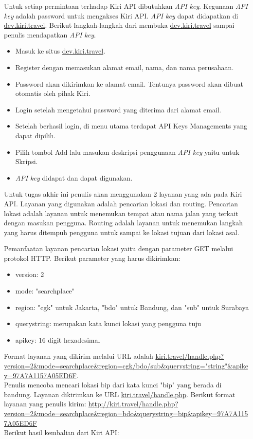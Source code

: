 \hspace{0.5cm} Untuk setiap permintaan terhadap Kiri API dibutuhkan \textit{API key}. Kegunaan \textit{API key} adalah password untuk mengakses Kiri API. \textit{API key} dapat didapatkan di \url{dev.kiri.travel}. Berikut langkah-langkah dari membuka \url{dev.kiri.travel} sampai penulis mendapatkan \textit{API key}.
\begin{itemize}
	\item Masuk ke situs \url{dev.kiri.travel}.
	\item Register dengan memasukan alamat email, nama, dan nama perusahaan.
	\item Password akan dikirimkan ke alamat email. Tentunya password akan dibuat otomatis oleh pihak Kiri.
	\item Login setelah mengetahui password yang diterima dari alamat email. 
	\item Setelah berhasil login, di menu utama terdapat API Keys Managements yang dapat dipilih.
	\item Pilih tombol Add lalu masukan deskripsi penggunaan \textit{API key} yaitu untuk Skripsi.
	\item \textit{API key} didapat dan dapat digunakan.
\end{itemize}
     
\hspace{0.5cm} Untuk tugas akhir ini penulis akan menggunakan 2 layanan yang ada pada Kiri API. Layanan yang digunakan adalah pencarian lokasi dan routing. Pencarian lokasi adalah layanan untuk menemukan tempat atau nama jalan yang terkait dengan masukan pengguna. Routing adalah layanan untuk menemukan langkah yang harus ditempuh pengguna untuk sampai ke lokasi tujuan dari lokasi asal. 

\hspace{0.5cm} Pemanfaatan layanan pencarian lokasi yaitu dengan parameter GET melalui protokol HTTP. Berikut parameter yang harus dikirimkan:
\begin{itemize}
	\item version: 2
	\item mode: "searchplace"
	\item region: "cgk" untuk Jakarta, "bdo" untuk Bandung, dan "sub" untuk Surabaya
	\item querystring: merupakan kata kunci lokasi yang pengguna tuju
	\item apikey: 16 digit hexadesimal
\end{itemize}
Format layanan yang dikirim melalui URL adalah \url{kiri.travel/handle.php?version=2&mode=searchplace&region=cgk/bdo/sub&querystring="string"&apikey=97A7A1157A05ED6F}.
\newline
\\Penulis mencoba mencari lokasi bip dari kata kunci "bip" yang berada di bandung. Layanan dikirimkan ke URL \url{kiri.travel/handle.php}. 
Berikut format layanan yang penulis kirim:\newline
{\url{http://kiri.travel/handle.php?version=2&mode=searchplace&region=bdo&querystring=bip&apikey=97A7A1157A05ED6F}}
\newline
\\Berikut hasil kembalian dari Kiri API: 

